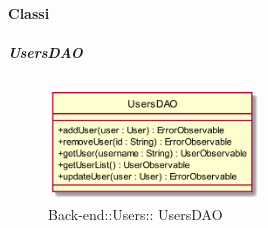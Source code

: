 \paragraph{Classi}
\hypertarget{ UsersDAO_label}{\subparagraph{ UsersDAO}}
\begin{figure}[h]
	\centering
	\includegraphics[width=0.50\textwidth,height=\textheight,keepaspectratio]{images/ClassUsersDAO.png}
	\caption{Back-end::Users:: UsersDAO}
\end{figure}
